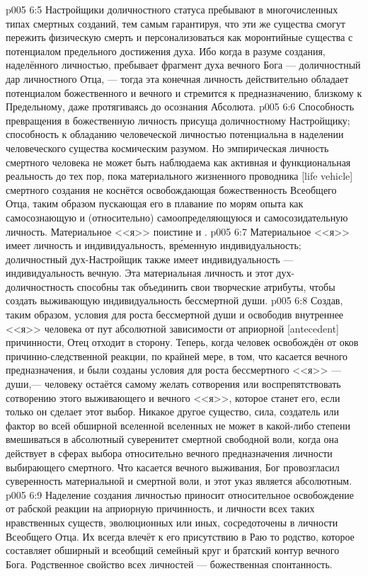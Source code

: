 \vs p005 6:5 \pc Настройщики доличностного статуса пребывают в многочисленных типах смертных созданий, тем самым гарантируя, что эти же существа смогут пережить физическую смерть и персонализоваться как моронтийные существа с потенциалом предельного достижения духа. Ибо когда в разуме создания, наделённого личностью, пребывает фрагмент духа вечного Бога --- доличностный дар личностного Отца, --- тогда эта конечная личность действительно обладает потенциалом божественного и вечного и стремится к предназначению, близкому к Предельному, даже протягиваясь до осознания Абсолюта.
\vs p005 6:6 Способность превращения в божественную личность присуща доличностному Настройщику; способность к обладанию человеческой личностью потенциальна в наделении человеческого существа космическим разумом. Но эмпирическая личность смертного человека не может быть наблюдаема как активная и функциональная реальность до тех пор, пока материального жизненного проводника [life vehicle] смертного создания не коснётся освобождающая божественность Всеобщего Отца, таким образом пускающая его в плавание по морям опыта как самосознающую и (относительно) самоопределяющуюся и самосозидательную личность. Материальное <<я>> поистине и .
\vs p005 6:7 \pc Материальное <<я>> имеет личность и индивидуальность, вр\'еменную индивидуальность; доличностный дух\hyp{}Настройщик также имеет индивидуальность --- индивидуальность вечную. Эта материальная личность и этот дух\hyp{}доличностность способны так объединить свои творческие атрибуты, чтобы создать выживающую индивидуальность бессмертной души.
\vs p005 6:8 Создав, таким образом, условия для роста бессмертной души и освободив внутреннее <<я>> человека от пут абсолютной зависимости от априорной [antecedent] причинности, Отец отходит в сторону. Теперь, когда человек освобождён от оков причинно\hyp{}следственной реакции, по крайней мере, в том, что касается вечного предназначения, и были созданы условия для роста бессмертного <<я>> --- души,--- человеку остаётся самому желать сотворения или воспрепятствовать сотворению этого выживающего и вечного <<я>>, которое станет его, если только он сделает этот выбор. Никакое другое существо, сила, создатель или фактор во всей обширной вселенной вселенных не может в какой\hyp{}либо степени вмешиваться в абсолютный суверенитет смертной свободной воли, когда она действует в сферах выбора относительно вечного предназначения личности выбирающего смертного. Что касается вечного выживания, Бог провозгласил суверенность материальной и смертной воли, и этот указ является абсолютным.
\vs p005 6:9 \pc Наделение создания личностью приносит относительное освобождение от рабской реакции на априорную причинность, и личности всех таких нравственных существ, эволюционных или иных, сосредоточены в личности Всеобщего Отца. Их всегда влечёт к его присутствию в Раю то родство, которое составляет обширный и всеобщий семейный круг и братский контур вечного Бога. Родственное свойство всех личностей --- божественная спонтанность.
